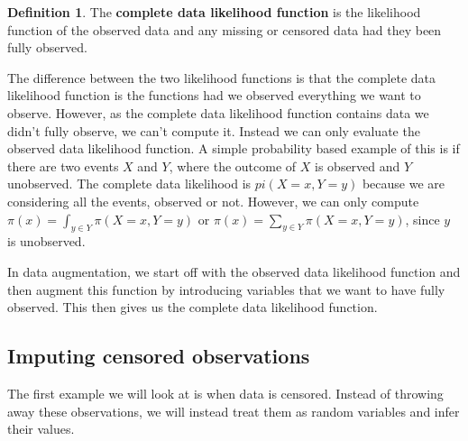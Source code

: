 \documentclass[
]{book}
\theoremstyle{definition}
\newtheorem{definition}{Definition}[chapter]
\theoremstyle{definition}
\theoremstyle{definition}
\theoremstyle{definition}
\theoremstyle{remark}
\begin{document}
\begin{definition}
The \textbf{complete data likelihood function} is the likelihood function of the observed data and any missing or censored data had they been fully observed.
\end{definition}

The difference between the two likelihood functions is that the complete data likelihood function is the functions had we observed everything we want to observe. However, as the complete data likelihood function contains data we didn't fully observe, we can't compute it. Instead we can only evaluate the observed data likelihood function. A simple probability based example of this is if there are two events \(X\) and \(Y\), where the outcome of \(X\) is observed and \(Y\) unobserved. The complete data likelihood is \(pi(X = x, Y = y)\) because we are considering all the events, observed or not. However, we can only compute \(\pi(x) = \int_{y \in Y}\pi(X = x, Y = y)\) or \(\pi(x) = \sum_{y \in Y}\pi(X = x, Y = y)\), since \(y\) is unobserved.

In data augmentation, we start off with the observed data likelihood function and then augment this function by introducing variables that we want to have fully observed. This then gives us the complete data likelihood function.

\hypertarget{imputing-censored-observations}{%
\subsection{Imputing censored observations}\label{imputing-censored-observations}}

The first example we will look at is when data is censored. Instead of throwing away these observations, we will instead treat them as random variables and infer their values.
\end{document}

